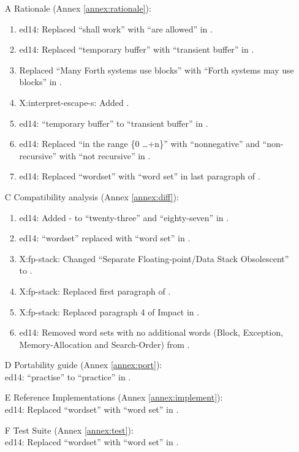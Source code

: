 \begin{itemize}
	\item[A] Rationale (Annex \ref{annex:rationale}):				%
		\begin{enumerate}
		\item \textsf{ed14}: Replaced ``shall work'' with ``are allowed'' in
			.
		\item \textsf{ed14}: Replaced ``temporary buffer'' with ``transient buffer'' in .
		\item Replaced ``Many Forth systems use blocks'' with ``Forth systems may use blocks'' in .
		\item \textsf{X:interpret-escape-s}: Added .
		\item \textsf{ed14}: ``temporary buffer'' to ``transient buffer'' in
			.
		\item \textsf{ed14}: Replaced ``in the range \{0 \ldots +n\}'' with
			``nonnegative'' and ``non-recursive'' with ``not recursive'' in
			.
		\item \textsf{ed14}: Replaced ``wordset'' with ``word set'' in last paragraph
			of .
		\end{enumerate}

	\item[C] Compatibility analysis (Annex \ref{annex:diff}):			%
		\begin{enumerate}
		\item \textsf{ed14}: Added - to ``twenty-three'' and ``eighty-seven''
			in .
		\item \textsf{ed14}: ``wordset'' replaced with ``word set'' in .
		\item \textsf{X:fp-stack}: Changed ``Separate Floating-point/Data Stack Obsolescent'' to .
		\item \textsf{X:fp-stack}: Replaced first paragraph of .
		\item \textsf{X:fp-stack}: Replaced paragraph 4 of Impact in .
		\item \textsf{ed14}: Removed word sets with no additional words
		(Block, Exception, Memory-Allocation and Search-Order)
		from .
		\end{enumerate}
		
	\item[D] Portability guide (Annex \ref{annex:port}):			%
		~ \\ \textsf{ed14}: ``practise'' to ``practice'' in .

	\item[E] Reference Implementations (Annex \ref{annex:implement}):	%
		~\\ \textsf{ed14}: Replaced ``wordset'' with ``word set'' in
			.

	\item[F] Test Suite (Annex \ref{annex:test}):					%
		~\\ \textsf{ed14}: Replaced ``wordset'' with ``word set'' in
			.
	\end{itemize}


